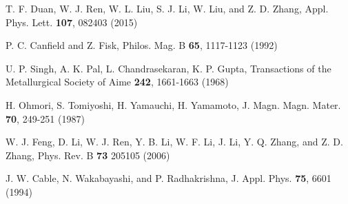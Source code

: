\documentclass[prb,twocolumn,showpacs,preprintnumbers,amsmath,amssymb]{revtex4}
\begin{document}
\begin{thebibliography}{}
T. F. Duan, W. J. Ren, W. L. Liu, S. J. Li, W. Liu, and Z. D. Zhang, Appl. Phys. Lett. {\bf 107}, 082403 (2015)





P. C. Canfield and Z. Fisk, Philos. Mag. B {\bf 65}, 1117-1123 (1992) 


U. P. Singh, A. K. Pal, L. Chandrasekaran, K. P. Gupta, Transactions of the Metallurgical Society of Aime {\bf 242}, 1661-1663 (1968)

H. Ohmori, S. Tomiyoshi, H. Yamauchi, H. Yamamoto, J. Magn. Magn. Mater. {\bf 70}, 249-251 (1987)



W. J. Feng, D. Li, W. J. Ren, Y. B. Li, W. F. Li, J. Li, Y. Q. Zhang, and Z. D. Zhang, Phys. Rev. B {\bf 73} 205105 (2006)



J. W. Cable, N. Wakabayashi, and P. Radhakrishna, J. Appl. Phys. {\bf 75}, 6601 (1994)






















\end{thebibliography}{}
\end{document}

